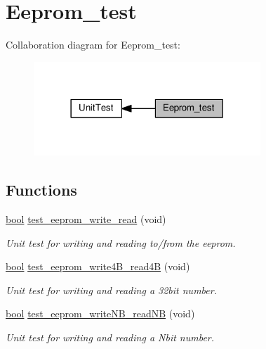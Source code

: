 \hypertarget{group__eeprom__test}{}\section{Eeprom\+\_\+test}
\label{group__eeprom__test}
Collaboration diagram for Eeprom\+\_\+test\+:\nopagebreak
\begin{figure}[H]
\begin{center}
\leavevmode
\includegraphics[width=242pt]{d6/d06/group__eeprom__test}
\end{center}
\end{figure}
\subsection*{Functions}
\begin{DoxyCompactItemize}
\item 
\hyperlink{group___utils_gaf6a258d8f3ee5206d682d799316314b1}{bool} \hyperlink{group__eeprom__test_ga7ca2c7ea92965216763b50e39a023637}{test\+\_\+eeprom\+\_\+write\+\_\+read} (void)
\begin{DoxyCompactList}\small\item\em Unit test for writing and reading to/from the eeprom. \end{DoxyCompactList}\item 
\hyperlink{group___utils_gaf6a258d8f3ee5206d682d799316314b1}{bool} \hyperlink{group__eeprom__test_ga636a43dafc205d49b2f8f72304f049e3}{test\+\_\+eeprom\+\_\+write4\+B\+\_\+read4B} (void)
\begin{DoxyCompactList}\small\item\em Unit test for writing and reading a 32bit number. \end{DoxyCompactList}\item 
\hyperlink{group___utils_gaf6a258d8f3ee5206d682d799316314b1}{bool} \hyperlink{group__eeprom__test_gaaaeaa64a1133a5628fe2dc75d888e880}{test\+\_\+eeprom\+\_\+write\+N\+B\+\_\+read\+NB} (void)
\begin{DoxyCompactList}\small\item\em Unit test for writing and reading a Nbit number. \end{DoxyCompactList}\end{DoxyCompactItemize}


